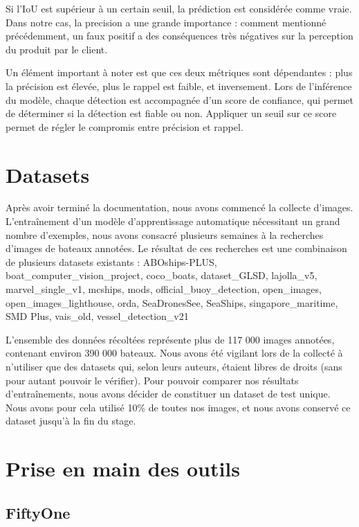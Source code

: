 Si l'IoU est supérieur à un certain seuil, la prédiction est considérée comme vraie.\\

Dans notre cas, la precision a une grande importance : comment mentionné précédemment,
un faux positif a des conséquences très négatives sur la perception du produit par le client.

Un élément important à noter est que ces deux métriques sont dépendantes : plus la précision est élevée,
plus le rappel est faible, et inversement. Lors de l'inférence du modèle, chaque détection est accompagnée
d'un score de confiance, qui permet de déterminer si la détection est fiable ou non. Appliquer un seuil
sur ce score permet de régler le compromis entre précision et rappel.\\

\section{Datasets}

Après avoir terminé la documentation, nous avons commencé la collecte d'images.
L'entraînement d'un modèle d'apprentissage automatique nécessitant un grand nombre d'exemples,
nous avons consacré plusieurs semaines à la recherches d'images de bateaux annotées.
Le résultat de ces recherches est une combinaison de plusieurs datasets existants :
ABOships-PLUS, boat\_computer\_vision\_project, coco\_boats, dataset\_GLSD, lajolla\_v5,
marvel\_single\_v1, mcships, mods, official\_buoy\_detection, open\_images, open\_images\_lighthouse,
orda, SeaDronesSee, SeaShips, singapore\_maritime, SMD Plus, vais\_old, vessel\_detection\_v21


L'ensemble des données récoltées représente plus de 117 000 images annotées, contenant environ 390 000 bateaux.
Nous avons été vigilant lors de la collecté à n'utiliser que des datasets qui, selon leurs auteurs,
étaient libres de droits (sans pour autant pouvoir le vérifier).
Pour pouvoir comparer nos résultats d'entraînements, nous avons décider de constituer un dataset
de test unique. Nous avons pour cela utilisé 10\% de toutes nos images, et nous avons conservé ce dataset
jusqu'à la fin du stage.

\section{Prise en main des outils}

\subsection{FiftyOne}

